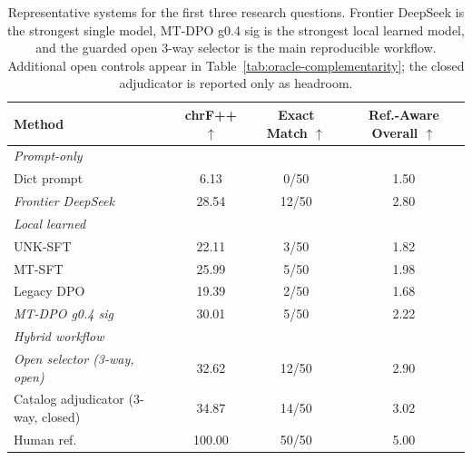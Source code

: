 \begin{table}[t]
\centering
\small
\begin{tabular}{lccc}
\toprule
Method & chrF++ $\uparrow$ & Exact Match $\uparrow$ & Ref.-Aware Overall $\uparrow$ \\
\midrule
\multicolumn{4}{l}{\textit{Prompt-only}} \\
Dict prompt & 6.13 & 0/50 & 1.50 \\
\textit{Frontier DeepSeek} & 28.54 & 12/50 & 2.80 \\
\midrule
\multicolumn{4}{l}{\textit{Local learned}} \\
UNK-SFT & 22.11 & 3/50 & 1.82 \\
MT-SFT & 25.99 & 5/50 & 1.98 \\
Legacy DPO & 19.39 & 2/50 & 1.68 \\
\textit{MT-DPO g0.4 sig} & 30.01 & 5/50 & 2.22 \\
\midrule
\multicolumn{4}{l}{\textit{Hybrid workflow}} \\
\textit{Open selector (3-way, open)} & 32.62 & 12/50 & 2.90 \\
Catalog adjudicator (3-way, closed) & 34.87 & 14/50 & 3.02 \\
\midrule
Human ref. & 100.00 & 50/50 & 5.00 \\
\bottomrule
\end{tabular}
\caption{Representative systems for the first three research questions. Frontier DeepSeek is the strongest single model, MT-DPO g0.4 sig is the strongest local learned model, and the guarded open 3-way selector is the main reproducible workflow. Additional open controls appear in Table~\ref{tab:oracle-complementarity}; the closed adjudicator is reported only as headroom.}
\label{tab:main-results}
\end{table}
